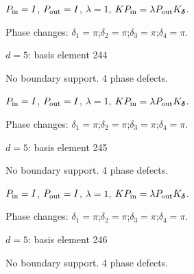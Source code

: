 \begin{center}
\end{center}
\vspace{-1mm}
$P_{\rm in}=I$, \quad $P_{\rm out}=I$, \quad $\lambda=1$, \qquad $K P_{\rm in}=\lambda P_{\rm out}K_{\boldsymbol\delta}$.
\par\smallskip\begin{minipage}{.98\linewidth}\small Phase changes: $\delta_{1}=\pi$;\quad $\delta_{2}=\pi$;\quad $\delta_{3}=\pi$;\quad $\delta_{4}=\pi$.\end{minipage}
\vfill
{\footnotesize\texttt{}}
\newpage
{}
{\Large $d=5$: basis element 244}\par
No boundary support. 4 phase defects.
\begin{center}
\end{center}
\vspace{-1mm}
$P_{\rm in}=I$, \quad $P_{\rm out}=I$, \quad $\lambda=1$, \qquad $K P_{\rm in}=\lambda P_{\rm out}K_{\boldsymbol\delta}$.
\par\smallskip\begin{minipage}{.98\linewidth}\small Phase changes: $\delta_{1}=\pi$;\quad $\delta_{2}=\pi$;\quad $\delta_{3}=\pi$;\quad $\delta_{4}=\pi$.\end{minipage}
\vfill
{\footnotesize\texttt{}}
\newpage
{}
{\Large $d=5$: basis element 245}\par
No boundary support. 4 phase defects.
\begin{center}
\end{center}
\vspace{-1mm}
$P_{\rm in}=I$, \quad $P_{\rm out}=I$, \quad $\lambda=1$, \qquad $K P_{\rm in}=\lambda P_{\rm out}K_{\boldsymbol\delta}$.
\par\smallskip\begin{minipage}{.98\linewidth}\small Phase changes: $\delta_{1}=\pi$;\quad $\delta_{2}=\pi$;\quad $\delta_{3}=\pi$;\quad $\delta_{4}=\pi$.\end{minipage}
\vfill
{\footnotesize\texttt{}}
\newpage
{}
{\Large $d=5$: basis element 246}\par
No boundary support. 4 phase defects.
\begin{center}
\end{center}
